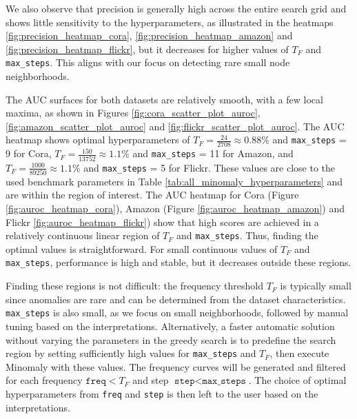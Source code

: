 \documentclass[pdflatex,sn-mathphys-num]{sn-jnl}%
\theoremstyle{thmstyleone}%
\theoremstyle{thmstyletwo}%
\theoremstyle{thmstylethree}%
\begin{document}
We also observe that precision is generally high across the entire search grid and shows little sensitivity to the hyperparameters, as illustrated in the heatmaps \ref{fig:precision_heatmap_cora}, \ref{fig:precision_heatmap_amazon} and \ref{fig:precision_heatmap_flickr}, but it decreases for higher values of $T_F$ and \texttt{max\_steps}. This aligns with our focus on detecting rare small node neighborhoods.

The AUC surfaces for both datasets are relatively smooth, with a few local maxima, as shown in Figures \ref{fig:cora_scatter_plot_auroc}, \ref{fig:amazon_scatter_plot_auroc} and \ref{fig:flickr_scatter_plot_auroc}. The AUC heatmap shows optimal hyperparameters of $T_F = \frac{24}{2708}\approx 0.88\%$ and \texttt{max\_steps} = 9 for Cora, $T_F = \frac{150}{13752}\approx 1.1\%$ and \texttt{max\_steps} = 11 for Amazon, and $T_F = \frac{1000}{89250}\approx 1.1\%$ and \texttt{max\_steps} = 5 for Flickr. These values are close to the used benchmark parameters in Table \ref{tab:all_minomaly_hyperparameters} and are within the region of interest. The AUC heatmap for Cora (Figure \ref{fig:auroc_heatmap_cora}), Amazon (Figure \ref{fig:auroc_heatmap_amazon}) and Flickr \ref{fig:auroc_heatmap_flickr}) show that high scores are achieved in a relatively continuous linear region of $T_F$ and \texttt{max\_steps}. Thus, finding the optimal values is straightforward. For small continuous values of $T_F$ and \texttt{max\_steps}, performance is high and stable, but it decreases outside these regions.

Finding these regions is not difficult: the frequency threshold \( T_F \) is typically small since anomalies are rare and can be determined from the dataset characteristics. \texttt{max\_steps} is also small, as we focus on small neighborhoods, followed by manual tuning based on the interpretations. Alternatively, a faster automatic solution without varying the parameters in the greedy search is to predefine the search region by setting sufficiently high values for \texttt{max\_steps} and \( T_F \), then execute Minomaly with these values. The frequency curves will be generated and filtered for each frequency \(\texttt{freq} < T_F\) and step \(\texttt{step} < \texttt{max\_steps}\). The choice of optimal hyperparameters from \texttt{freq} and \texttt{step} is then left to the user based on the interpretations.
\end{document}

